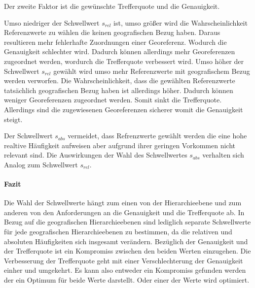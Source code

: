 					Der zweite Faktor ist die gewünschte Trefferquote und die Genauigkeit.

					Umso niedriger der Schwellwert $s_{rel}$ ist, umso größer wird die Wahrscheinlichkeit Referenzwerte zu wählen die keinen geografischen Bezug haben.
					Daraus resultieren mehr fehlerhafte Zuordnungen einer Georeferenz.
					Wodurch die Genauigkeit schlechter wird.
					Dadurch können allerdings mehr Georeferenzen zugeordnet werden, wordurch die Trefferquote verbessert wird.
					Umso höher der Schwellwert $s_{rel}$ gewählt wird umso mehr Referenzwerte mit geografischem Bezug werden verworfen.
					Die Wahrscheinlichkeit, dass die gewählten Referenzwerte tatsächlich geografischen Bezug haben ist allerdings höher.
					Dadurch können weniger Georeferenzen zugeordnet werden.
					Somit sinkt die Trefferquote.
					Allerdings sind die zugewiesenen Georeferenzen sicherer womit die Genauigkeit steigt.

					Der Schwellwert $s_{abs}$ vermeidet, dass Refrenzwerte gewählt werden die eine hohe realtive Häufigkeit aufweisen aber aufgrund ihrer geringen Vorkommen nicht relevant sind.
					Die Auswirkungen der Wahl des Schwellwertes $s_{abs}$ verhalten sich Analog zum Schwellwert $s_{rel}$.

				\paragraph{Fazit}

					Die Wahl der Schwellwerte hängt zum einen von der Hierarchieebene und zum anderen von den Anforderungen an die Genauigkeit und die Trefferquote ab.
					In Bezug auf die geografischen Hierarchieebenen sind lediglich separate Schwellwerte für jede geografischen Hierarchieebenen zu bestimmen, da die relativen und absoluten Häufigkeiten sich insgesamt verändern.
					Bezüglich der Genauigkeit und der Trefferquote ist ein Kompromiss zwischen den beiden Werten einzugehen. 
					Die Verbesserung der Trefferquote geht mit einer Verschlechterung der Genauigkeit einher und umgekehrt.
					Es kann also entweder ein Kompromiss gefunden werden der ein Optimum für beide Werte darstellt. 
					Oder einer der Werte wird optimiert. 